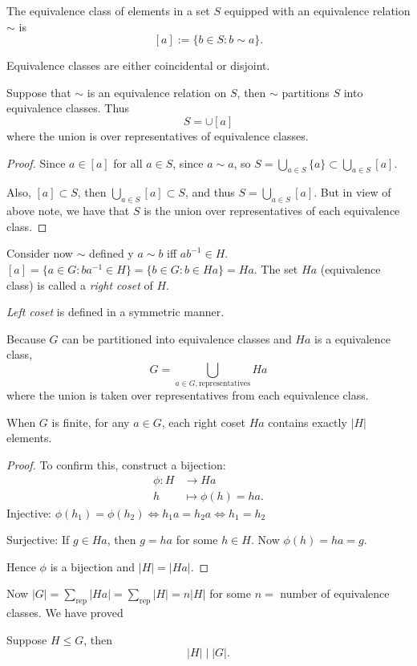 \begin{definition}
	The equivalence class of elements in a set $S$ equipped with an equivalence relation $\sim $ is \[
		[a]:=\{b \in S: b\sim a\} 
	.\] 
\end{definition}
\begin{lemma} Equivalence classes are either coincidental or disjoint.
\end{lemma}
\begin{theorem}
	Suppose that $\sim $ is an equivalence relation on $S$, then $\sim $ partitions $S$ into equivalence classes. Thus  \[
		S = \cup \left[ a \right] 
	\] 
	where the union is over representatives of equivalence classes.
	
\end{theorem}
\begin{proof}
	Since $a \in [a]$ for all $a \in S$, since $a\sim a$, so $S = \bigcup_{a \in S} \{a\}\subset \bigcup_{a \in S}  [a]$.

	Also, $[a] \subset S$, then $\bigcup_{a \in S} [a] \subset S$, and thus $S = \bigcup_{a \in S} [a]$. But in view of above note, we have that $S $ is the union over representatives of each equivalence class.
\end{proof}
\begin{definition}[Coset]
Consider now $\sim $ defined y $a\sim b$ iff $ab^{-1} \in H$. $[a] = \{a \in G: ba^{-1}  \in H\} = \{b \in G: b \in Ha\}  = Ha$. The set $Ha$ (equivalence class) is called a  \textit{right coset} of $H$.

\textit{Left coset} is defined in a symmetric manner.
\end{definition}
Because $G$ can be partitioned into equivalence classes and  $Ha$ is a equivalence class,
\[
	G = \bigcup_{a \in G, \text{representatives}}  Ha
\] 
where the union is taken over representatives from each equivalence class.

\begin{claim}
	When $G$ is finite, for any $a \in G$, each right coset $Ha$ contains exactly $|H|$ elements.
\end{claim}
\begin{proof}
To confirm this, construct a bijection: 
\begin{align*}
	\phi: H &\longrightarrow Ha \\
	h &\longmapsto \phi(h) = ha
.\end{align*}
Injective: $\phi(h_1) = \phi(h_2) \iff h_1a = h_2a \iff h_1 = h_2$

Surjective: If $g \in Ha$, then $g = ha $ for some $h \in H$. Now $\phi(h) = ha = g$.

Hence $\phi$ is a bijection and $|H| = |Ha|$.
\end{proof}

Now $|G| = \sum_{\text{rep}} |Ha| = \sum_{\text{rep}} |H| = n|H|$ for some $n=$ number of equivalence classes. We have proved
\begin{theorem}
	Suppose $H \le G$, then \[
		|H| \mid |G|
	.\] 
\end{theorem}
